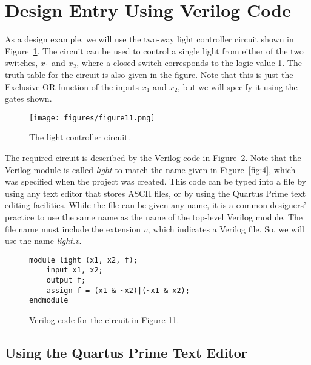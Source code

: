 \section{Design Entry Using Verilog Code}


\noindent
As a design example, we will use the two-way light controller circuit shown in 
Figure~\ref{fig:11}. The circuit can be used to control a single light from either of the
two switches, $x_1$ and $x_2$, where a closed switch corresponds to the logic value 1.
The truth table for the circuit is also given in the figure. Note that
this is just the Exclusive-OR function of the inputs $x_1$ and $x_2$,
but we will specify it using the gates shown.

\begin{figure}[H]
   \begin{center}
      \texttt{[image: figures/figure11.png]}
   \caption{The light controller circuit.} 
	 \label{fig:11}
	 \end{center}
\end{figure}

The required circuit is described by the Verilog code in Figure~\ref{fig:12}.
Note that the Verilog module is called {\it light} to match the name given in 
Figure~\ref{fig:4}, which was specified when the project was created.
This code can be typed into a file by using any text editor
that stores ASCII files, or by using the Quartus Prime text editing facilities.
While the file can be given any name, it is a common designers' practice to
use the same name as the name of the top-level Verilog module.
The file name must include the extension $v$, which indicates a Verilog
file. So, we will use the name {\it light.v}.

\lstset{language=Verilog}
\begin{figure}[H]
\begin{center}
\begin{lstlisting}
module light (x1, x2, f);
	input x1, x2;
	output f;
	assign f = (x1 & ~x2)|(~x1 & x2);
endmodule 
\end{lstlisting}
\end{center}
\vspace{-0.33in}
	\caption{Verilog code for the circuit in Figure 11.}
	\label{fig:12}
\end{figure}

\subsection{Using the Quartus\textsuperscript{\textregistered}	 Prime Text Editor}

